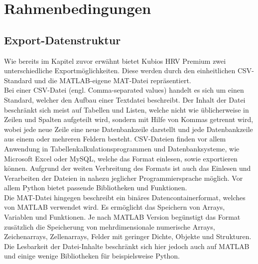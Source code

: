 
\chapter{Rahmenbedingungen}


\section{Export-Datenstruktur}

Wie bereits im Kapitel zuvor erwähnt bietet Kubios HRV Premium zwei unterschiedliche Exportmöglichkeiten. Diese werden durch den einheitlichen CSV-Standard und die MATLAB-eigene MAT-Datei repräsentiert.\\
Bei einer CSV-Datei (engl. Comma-separated values) handelt es sich um einen Standard, welcher den Aufbau einer Textdatei beschreibt. Der Inhalt der Datei beschränkt sich meist auf Tabellen und Listen, welche nicht wie üblicherweise in Zeilen und Spalten aufgeteilt wird, sondern mit Hilfe von Kommas getrennt wird, wobei jede neue Zeile eine neue Datenbankzeile darstellt und jede Datenbankzeile aus einem oder mehreren Feldern besteht. CSV-Dateien finden vor allem Anwendung in Tabellenkalkulationsprogrammen und Datenbanksysteme, wie Microsoft Excel oder MySQL, welche das Format einlesen, sowie exportieren können. Aufgrund der weiten Verbreitung des Formats ist auch das Einlesen und Verarbeiten der Dateien in nahezu jeglicher Programmiersprache möglich. Vor allem Python bietet passende Bibliotheken und Funktionen.\cite{csv}\\
Die MAT-Datei hingegen beschreibt ein binäres Datencontainerformat, welches von MATLAB verwendet wird. Es ermöglicht das Speichern von Arrays, Variablen und Funktionen. Je nach MATLAB Version begünstigt das Format zusätzlich die Speicherung von mehrdimensionale numerische Arrays, Zeichenarrays, Zellenarrays, Felder mit geringer Dichte, Objekte und Strukturen. Die Lesbarkeit der Datei-Inhalte beschränkt sich hier jedoch auch auf MATLAB und einige wenige Bibliotheken für beispielsweise Python.\cite{mat}

